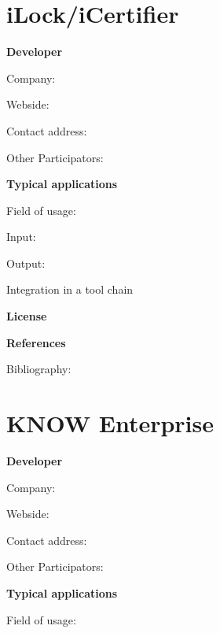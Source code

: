 \documentclass{./template/openetcs2}
\begin{document}
\section{iLock/iCertifier}

	\textbf{Developer}

	Company: 

	Webside:

	Contact address:

	Other  Participators:



	\textbf{Typical applications}

	Field of usage:


	Input:

	Output:





	Integration in a tool chain



	\textbf{License}


	\textbf{References}

	Bibliography:


\section{KNOW Enterprise}

	\textbf{Developer}

	Company: 

	Webside:

	Contact address:

	Other  Participators:



	\textbf{Typical applications}

	Field of usage:

\end{document}

